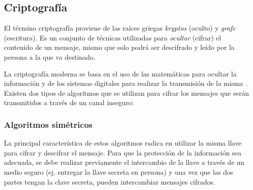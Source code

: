   \subsection {Criptograf\'{i}a}

El t\'{e}rmino criptograf\'{i}a proviene de las ra\'{i}ces griegas \emph{kryptos} (oculto) y \emph{grafe} (escritura). Es un conjunto de t\'{e}cnicas utilizadas para \emph{ocultar} (cifrar) el contenido de un mensaje, mismo que solo podr\'{a} ser descifrado y le\'{i}do por la persona a la que va destinado\cite{_criptografi-_????}.

La criptograf\'{i}a moderna se basa en el uso de las matem\'{a}ticas para ocultar la informaci\'{o}n y de los sistemas digitales para realizar la transmisi\'{o}n de la misma \cite{_powerpoint_????}. Existen dos tipos de algoritmos que se utilizan para cifrar los mensajes que ser\'{a}n transmitidos a trav\'{e}s de un canal inseguro:

    \subsubsection {Algoritmos sim\'{e}tricos}

La principal caracter\'{i}stica de estos algoritmos radica en utilizar la misma llave para cifrar y descifrar el mensaje. Para que la protecci\'{o}n de la informaci\'{o}n sea adecuada, se debe realizar previamente el intercambio de la llave a trav\'{e}s de un medio seguro (ej. entregar la llave secreta en persona) y una vez que las dos partes tengan la clave secreta, pueden intercambiar mensajes cifrados.

